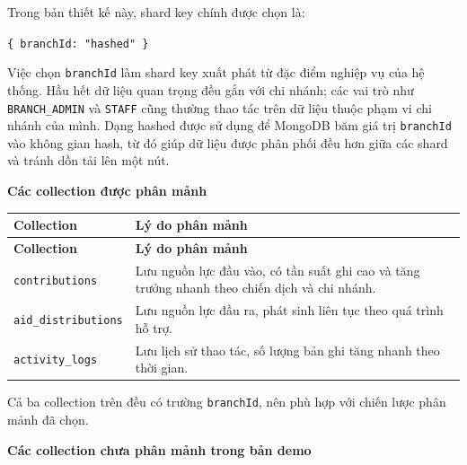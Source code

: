 \documentclass[12pt,a4paper]{article}
\begin{document}
Trong bản thiết kế này, shard key chính được chọn là:

\begin{center}
\texttt{\{ branchId: "hashed" \}}
\end{center}

Việc chọn \texttt{branchId} làm shard key xuất phát từ đặc điểm nghiệp vụ của hệ thống. Hầu hết dữ liệu quan trọng đều gắn với chi nhánh; các vai trò như \texttt{BRANCH\_ADMIN} và \texttt{STAFF} cũng thường thao tác trên dữ liệu thuộc phạm vi chi nhánh của mình. Dạng hashed được sử dụng để MongoDB băm giá trị \texttt{branchId} vào không gian hash, từ đó giúp dữ liệu được phân phối đều hơn giữa các shard và tránh dồn tải lên một nút.

\textbf{Các collection được phân mảnh}

\begin{center}
\small
\begin{longtable}{|p{3.7cm}|p{8.8cm}|}
\hline
\textbf{Collection} & \textbf{Lý do phân mảnh} \\ \hline
\endfirsthead
\hline
\textbf{Collection} & \textbf{Lý do phân mảnh} \\ \hline
\endhead
\texttt{contributions} & Lưu nguồn lực đầu vào, có tần suất ghi cao và tăng trưởng nhanh theo chiến dịch và chi nhánh. \\ \hline
\texttt{aid\_distributions} & Lưu nguồn lực đầu ra, phát sinh liên tục theo quá trình hỗ trợ. \\ \hline
\texttt{activity\_logs} & Lưu lịch sử thao tác, số lượng bản ghi tăng nhanh theo thời gian. \\ \hline
\end{longtable}
\normalsize
\end{center}

Cả ba collection trên đều có trường \texttt{branchId}, nên phù hợp với chiến lược phân mảnh đã chọn.

\textbf{Các collection chưa phân mảnh trong bản demo}
\end{document}
